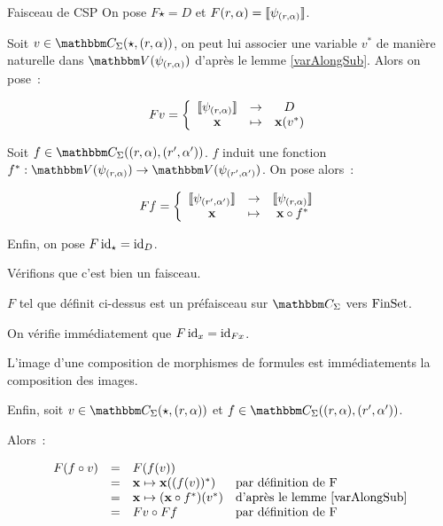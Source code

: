\begin{defi}{Faisceau de CSP}
    On pose $F\star = D$ et $F(r,\alpha) = \llbracket {\psi_{(r,\alpha)}} \rrbracket$.

    Soit $v\in\C_\Sigma(\star, (r,\alpha))$, on peut lui associer une variable
    $v^*$ de manière naturelle dans $\V(\psi_{(r,\alpha)})$ d'après le lemme 
    \ref{varAlongSub}. Alors on pose~:
    
    \[ Fv = \left\{\begin{array}{ccc}
                       \llbracket {\psi_{(r,\alpha)}} \rrbracket & \rightarrow & D              \\
                             \mathbf{x}        & \mapsto     & \mathbf{x}(v^*) \\
    \end{array}\right.\]

    Soit $f\in\C_\Sigma((r,\alpha), (r',\alpha'))$. $f$ induit une fonction
    $f^* : \V(\psi_{(r,\alpha)})\rightarrow\V(\psi_{(r',\alpha')})$. On pose alors~:

    \[ Ff = \left\{\begin{array}{ccc}
                    \llbracket {\psi_{(r',\alpha')}} \rrbracket & \rightarrow & \llbracket {\psi_{(r,\alpha)}} \rrbracket \\
                           \mathbf{x}         & \mapsto     & \mathbf{x} \circ f^* \\
    \end{array}\right.\]

    Enfin, on pose $F\operatorname{id}_\star = \operatorname{id}_D$.
\end{defi}

Vérifions que c'est bien un faisceau.

\begin{lem}
    $F$ tel que définit ci-dessus est un préfaisceau sur $\C_\Sigma$ vers $\text{FinSet}$.
\end{lem}

\begin{pv}
    On vérifie immédiatement que $F\operatorname{id}_x = \operatorname{id}_{Fx}$.

    L'image d'une composition de morphismes de formules est immédiatements la composition
    des images.

    Enfin, soit $v\in\C_\Sigma(\star, (r,\alpha))$ et
    $f\in\C_\Sigma((r,\alpha), (r',\alpha'))$.

    Alors~:
    
    \[\begin{array}{rcll}
        F(f\circ v) & = & F(f(v)) & \\
                    & = & \mathbf{x}\mapsto \mathbf{x}((f(v))^*) 
                            & \text{par définition de F} \\
                    & = & \mathbf{x}\mapsto (\mathbf{x}\circ f^*)(v^*)
                            & \text{d'après le lemme \ref{varAlongSub}} \\
                    & = & Fv \circ Ff & \text{par définition de F} \\
    \end{array}\]
\end{pv}

